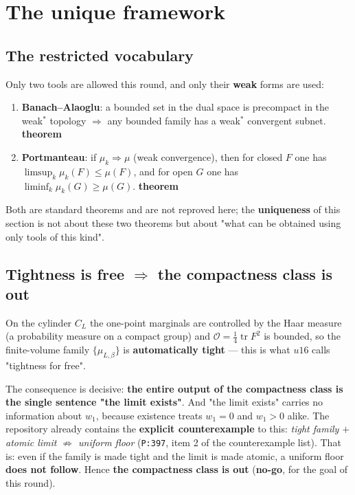 \documentclass[11pt,a4paper]{article}
\newcommand{\lvT}{\textcolor{cT}{\textbf{theorem}}}
\newcommand{\lvNG}{\textcolor{cNG}{\textbf{no-go}}}
\newcommand{\bet}{\beta}
\begin{document}
\section{The unique framework}

\subsection{The restricted vocabulary}

Only two tools are allowed this round, and only their \textbf{weak} forms are used:
\begin{enumerate}[leftmargin=1.6em,itemsep=2pt,topsep=2pt]
  \item \textbf{Banach--Alaoglu}: a bounded set in the dual space is precompact in the weak$^\ast$ topology $\Rightarrow$ any bounded family has a weak$^\ast$ convergent subnet. \lvT
  \item \textbf{Portmanteau}: if $\mu_k\Rightarrow\mu$ (weak convergence), then for closed $F$ one has $\limsup_k\mu_k(F)\le\mu(F)$, and for open $G$ one has $\liminf_k\mu_k(G)\ge\mu(G)$. \lvT
\end{enumerate}
Both are standard theorems and are not reproved here; the \textbf{uniqueness} of this section is not about these two theorems but about "what can be obtained using only tools of this kind".

\subsection{Tightness is free $\Rightarrow$ the compactness class is out}

On the cylinder $C_L$ the one-point marginals are controlled by the Haar measure (a probability measure on a compact group) and $\mathcal{O}=\tfrac14\operatorname{tr}F^2$ is bounded, so the finite-volume family $\{\mu_{L,\bet}\}$ is \textbf{automatically tight} --- this is what $u16$ calls "tightness for free".

The consequence is decisive: \textbf{the entire output of the compactness class is the single sentence "the limit exists"}. And "the limit exists" carries no information about $w_1$, because existence treats $w_1=0$ and $w_1>0$ alike. The repository already contains the \textbf{explicit counterexample} to this: \emph{tight family $+$ atomic limit $\not\Rightarrow$ uniform floor} (\texttt{P:397}, item 2 of the counterexample list). That is: even if the family is made tight and the limit is made atomic, a uniform floor \textbf{does not follow}. Hence \textbf{the compactness class is out} (\lvNG, for the goal of this round).
\end{document}
